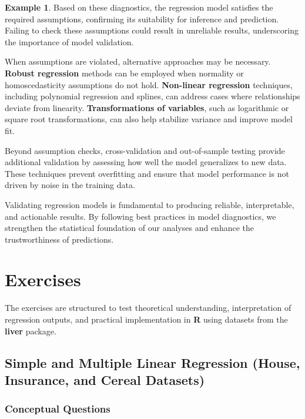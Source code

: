 \documentclass[
  11pt,
]{book}
\theoremstyle{definition}
\theoremstyle{definition}
\newtheorem{example}{Example}[chapter]
\theoremstyle{definition}
\theoremstyle{definition}
\theoremstyle{remark}
\begin{document}
\begin{example}
Based on these diagnostics, the regression model satisfies the required assumptions, confirming its suitability for inference and prediction. Failing to check these assumptions could result in unreliable results, underscoring the importance of model validation.
\end{example}

When assumptions are violated, alternative approaches may be necessary. \textbf{Robust regression} methods can be employed when normality or homoscedasticity assumptions do not hold. \textbf{Non-linear regression} techniques, including polynomial regression and splines, can address cases where relationships deviate from linearity. \textbf{Transformations of variables}, such as logarithmic or square root transformations, can also help stabilize variance and improve model fit.

Beyond assumption checks, cross-validation and out-of-sample testing provide additional validation by assessing how well the model generalizes to new data. These techniques prevent overfitting and ensure that model performance is not driven by noise in the training data.

Validating regression models is fundamental to producing reliable, interpretable, and actionable results. By following best practices in model diagnostics, we strengthen the statistical foundation of our analyses and enhance the trustworthiness of predictions.

\section{Exercises}\label{regression-exercises}

The exercises are structured to test theoretical understanding, interpretation of regression outputs, and practical implementation in \textbf{R} using datasets from the \textbf{liver} package.

\subsection*{Simple and Multiple Linear Regression (House, Insurance, and Cereal Datasets)}\label{simple-and-multiple-linear-regression-house-insurance-and-cereal-datasets}


\subsubsection*{Conceptual Questions}\label{conceptual-questions-6}
\end{document}
